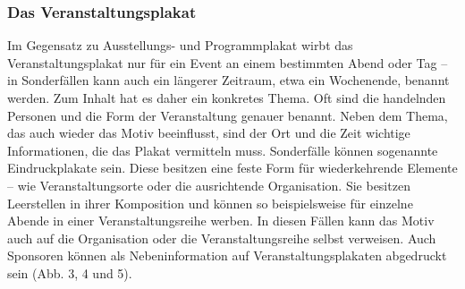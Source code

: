 \documentclass[a4paper,12pt,ngerman]{article}
\begin{document}
\subsubsection{Das Veranstaltungsplakat}
Im Gegensatz zu Ausstellungs- und Programmplakat wirbt das Veranstaltungsplakat nur für ein Event an einem bestimmten Abend oder Tag – in Sonderfällen kann auch ein längerer Zeitraum, etwa ein Wochenende, benannt werden. Zum Inhalt hat es daher ein konkretes Thema. Oft sind die handelnden Personen und die Form der Veranstaltung genauer benannt. Neben dem Thema, das auch wieder das Motiv beeinflusst, sind der Ort und die Zeit wichtige Informationen, die das Plakat vermitteln muss. Sonderfälle können sogenannte Eindruckplakate sein. Diese besitzen eine feste Form für wiederkehrende Elemente – wie Veranstaltungsorte oder die ausrichtende Organisation. Sie besitzen Leerstellen in ihrer Komposition und können so beispielsweise für einzelne Abende in einer Veranstaltungsreihe werben. In diesen Fällen kann das Motiv auch auf die Organisation oder die Veranstaltungsreihe selbst verweisen. Auch Sponsoren können als Nebeninformation auf Veranstaltungsplakaten abgedruckt sein (Abb. 3, 4 und 5). \\
\end{document}
